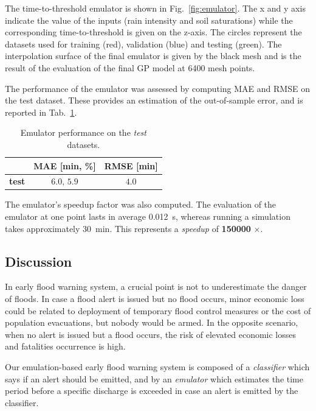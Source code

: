 The time-to-threshold emulator is shown in Fig.~\ref{fig:emulator}.
The x and y axis indicate the value of the inputs (rain intensity and soil saturations) while the corresponding time-to-threshold is given on the z-axis.
The circles represent the datasets used for training (red), validation (blue) and testing (green).
The interpolation surface of the final emulator is given by the black mesh and is the result of the evaluation of the final GP model at \num{6400} mesh points.

The performance of the emulator was assessed by computing MAE and RMSE on the test dataset.
These provides an estimation of the out-of-sample error, and is reported in Tab.~\ref{tab:emulator_performance}.

\begin{table}[h]
  \centering
  \caption{Emulator performance on the \emph{test} datasets.}
  \label{tab:emulator_performance}
  \begin{tabular}{lcc}
    \toprule
     & \textbf{MAE [\si{\minute}, \si{\percent}]} & \textbf{RMSE [\si{\minute}]} \\
    \midrule
    \textbf{test} & $6.0,\,5.9$ & $4.0$\\
    \bottomrule
  \end{tabular}
\end{table}

The emulator's speedup factor was also computed.
The evaluation of the emulator at one point lasts in average \SI{0.012}{\s}, whereas running a simulation takes approximately \SI{30}{\minute}.
This represents a \emph{speedup} of \textbf{\num{150000}} $\bm{\times}$.

\subsection{Discussion}

In early flood warning system, a crucial point is not to underestimate the danger of floods.
In case a flood alert is issued but no flood occurs, minor economic loss could be related to deployment of temporary flood control measures or the cost of population evacuations, but nobody would be armed. 
In the opposite scenario, when no alert is issued but a flood occurs, the risk of elevated economic losses and  fatalities occurrence is high. 
 
Our emulation-based early flood warning system is composed of a \emph{classifier} which says if an alert should be emitted, and by an \emph{emulator} which estimates the time period before a specific discharge is exceeded in case an alert is emitted by the classifier.


